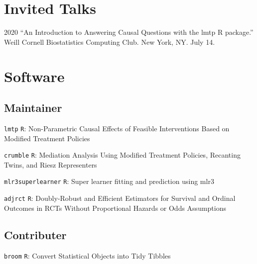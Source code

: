 \documentclass[12pt,letterpaper]{report}
\begin{document}
    \section*{Invited Talks}

    \begin{tablist}

        \item[2020] \tab \enquote{An Introduction to Answering Causal Questions with the lmtp R package.} Weill Cornell Biostatistics Computing Club. New York, NY. July 14.

    \end{tablist}
    
    \section*{Software}
    
    \subsection*{Maintainer}
    
    \begin{tablist}
    
    	\item[{\footnotesize \texttt{lmtp}}] \tab \texttt{R}: Non-Parametric Causal Effects of Feasible Interventions Based on Modified Treatment Policies
	
	    	\item[{\footnotesize \texttt{crumble}}] \tab \texttt{R}: Mediation Analysis Using Modified Treatment Policies, Recanting Twins, and Riesz Representers
		
		\item[{\footnotesize \texttt{mlr3superlearner}}] \tab \texttt{R}: Super learner fitting and prediction using mlr3
		
		\item[{\footnotesize \texttt{adjrct}}] \tab \texttt{R}: Doubly-Robust and Efficient Estimators for Survival and Ordinal Outcomes in RCTs Without Proportional Hazards or Odds Assumptions
    
    \end{tablist}
    
    \subsection*{Contributer}
    
    \begin{tablist}
    
    	\item[{\footnotesize \texttt{broom}}] \tab \texttt{R}: Convert Statistical Objects into Tidy Tibbles
    
    \end{tablist}
\end{document}
